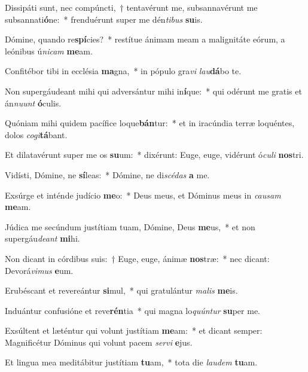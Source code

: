\item Dissipáti sunt, nec compúncti,~† tentavérunt me, subsannavérunt me subsannati\textbf{ó}ne:~* frenduérunt super me dén\textit{ti}\textit{bus} \textbf{su}is.
\item Dómine, quando re\textbf{spí}cies?~* restítue ánimam meam a malignitáte eórum, a leónibus ú\textit{ni}\textit{cam} \textbf{me}am.
\item Confitébor tibi in ecclésia \textbf{ma}gna,~* in pópulo gra\textit{vi} \textit{lau}\textbf{dá}bo te.
\item Non supergáudeant mihi qui adversántur mihi in\textbf{í}que:~* qui odérunt me gratis et án\textit{nu}\textit{unt} \textbf{ó}culis.
\item Quóniam mihi quidem pacífice loque\textbf{bán}tur:~* et in iracúndia terræ loquéntes, dolos \textit{co}\textit{gi}\textbf{tá}bant.
\item Et dilatavérunt super me os \textbf{su}um:~* dixérunt: Euge, euge, vidérunt ó\textit{cu}\textit{li} \textbf{nos}tri.
\item Vidísti, Dómine, ne \textbf{sí}leas:~* Dómine, ne di\textit{scé}\textit{das} \textbf{a} me.
\item Exsúrge et inténde judício \textbf{me}o:~* Deus meus, et Dóminus meus in \textit{cau}\textit{sam} \textbf{me}am.
\item Júdica me secúndum justítiam tuam, Dómine, Deus \textbf{me}us,~* et non supergáu\textit{de}\textit{ant} \textbf{mi}hi.
\item Non dicant in córdibus suis:~† Euge, euge, ánimæ \textbf{nos}træ:~* nec dicant: Devorá\textit{vi}\textit{mus} \textbf{e}um.
\item Erubéscant et revereántur \textbf{si}mul,~* qui gratulántur \textit{ma}\textit{lis} \textbf{me}is.
\item Induántur confusióne et reve\textbf{rén}tia~* qui magna lo\textit{quún}\textit{tur} \textbf{su}per me.
\item Exsúltent et læténtur qui volunt justítiam \textbf{me}am:~* et dicant semper: Magnificétur Dóminus qui volunt pacem \textit{ser}\textit{vi} \textbf{e}jus.
\item Et lingua mea meditábitur justítiam \textbf{tu}am,~* tota die \textit{lau}\textit{dem} \textbf{tu}am.
